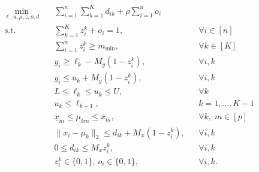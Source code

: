 \documentclass[11pt]{article}
\theoremstyle{plain}
\theoremstyle{definition}
\newcommand{\1}{\mathbf{1}}
\begin{document}
\begin{align*}
\min_{\ell,u,\mu,z,o,d}\quad
& \sum_{i=1}^n\sum_{k=1}^K d_{ik} + \rho \sum_{i=1}^n o_i \\[2mm]
\text{s.t.}\quad
& \sum_{k=1}^K z_i^k + o_i = 1, && \forall i \in [n] \\
& \sum_{i=1}^n z_i^k \ge m_{\min}, && \forall k \in [K] \\[1mm]
& y_i \ge \ell_k - M_y(1-z_i^k), && \forall i,k \\
& y_i \le u_k + M_y(1-z_i^k), && \forall i,k \\[1mm]
& L \le \ell_k \le u_k \le U, && \forall k \\
& u_k \le \ell_{k+1}, && k=1,\dots,K-1 \\[1mm]
& \underline{x}_m \le \mu_{km} \le \overline{x}_m, && \forall k,\; m \in [p] \\[1mm]
& \|x_i - \mu_k\|_2 \le d_{ik} + M_x(1-z_i^k), && \forall i,k \\
& 0 \le d_{ik} \le M_x z_i^k, && \forall i,k \\[1mm]
& z_i^k \in \{0,1\},\ o_i \in \{0,1\}, && \forall i,k.
\end{align*}
\end{document}

